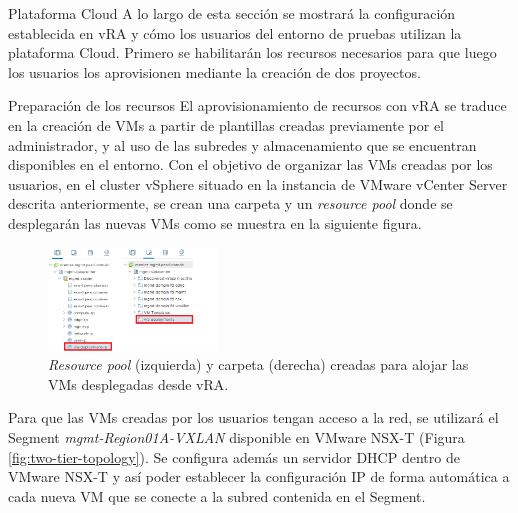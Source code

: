 \begin{subsection}{Plataforma Cloud}
    A lo largo de esta sección se mostrará la configuración establecida en vRA y cómo los usuarios del entorno de pruebas utilizan la plataforma Cloud. Primero se habilitarán los recursos necesarios para que luego los usuarios los aprovisionen mediante la creación de dos proyectos. 

    \begin{subsubsection}{Preparación de los recursos}
    El aprovisionamiento de recursos con vRA se traduce en la creación de VMs a partir de plantillas creadas previamente por el administrador, y al uso de las subredes y almacenamiento que se encuentran disponibles en el entorno. Con el objetivo de organizar las VMs creadas por los usuarios, en el cluster vSphere situado en la instancia de VMware vCenter Server descrita anteriormente, se crean una carpeta y un \textit{resource pool} donde se desplegarán las nuevas VMs como se muestra en la siguiente figura.
    \begin{figure}[h]
        \centering
        \includegraphics[width=0.4\textwidth]{imaxes/pruebaconcepto/vrealize/rp-vra.png}
        \caption{\textit{Resource pool} (izquierda) y carpeta (derecha) creadas para alojar las VMs desplegadas desde vRA.}
        \label{fig:rp-folder-vra}
    \end{figure}
    \FloatBarrier
    Para que las VMs creadas por los usuarios tengan acceso a la red, se utilizará el Segment \textit{mgmt-Region01A-VXLAN} disponible en VMware NSX-T (Figura \ref{fig:two-tier-topology}). Se configura además un servidor DHCP dentro de VMware NSX-T y así poder establecer la configuración IP de forma automática a cada nueva VM que se conecte a la subred contenida en el Segment. 

\end{subsubsection}
\end{subsection}
